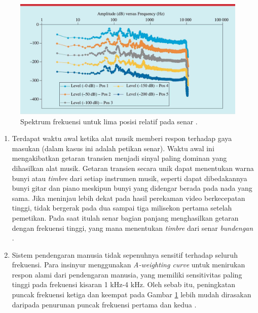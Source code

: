 \begin{figure}[t!]
    \centering
    \includegraphics[width=14 cm]{Gambar/spektrumFrekPaperParikesit.jpg}
    \caption{Spektrum frekuensi untuk lima posisi relatif \bandulan pada senar \cite{illusiveSound}.}
    \label{fig:spektrumFrekPaperParikesit}
\end{figure}
\begin{enumerate}
    \item Terdapat waktu awal ketika alat musik memberi respon terhadap gaya masukan (dalam kasus ini adalah petikan senar). Waktu awal ini mengakibatkan getaran transien menjadi sinyal paling dominan yang dihasilkan alat musik. Getaran transien secara unik dapat menentukan warna bunyi atau \textit{timbre} dari setiap instrumen musik, seperti dapat dibedakannya bunyi gitar dan piano meskipun bunyi yang didengar berada pada nada yang sama. Jika meninjau lebih dekat pada hasil perekaman video berkecepatan tinggi, \bandulan tidak bergerak pada dua sampai tiga milisekon pertama setelah pemetikan. Pada saat itulah senar bagian panjang menghasilkan getaran dengan frekuensi tinggi, yang mana menentukan \textit{timbre} dari senar \textit{bundengan} \cite{illusiveSound}.
    \item Sistem pendengaran manusia tidak sepenuhnya sensitif terhadap seluruh frekuensi. Para insinyur menggunakan \textit{A-weighting curve} untuk menirukan respon alami dari pendengaran manusia, yang memiliki sensitivitas paling tinggi pada frekuensi kisaran 1 kHz-4 kHz. Oleh sebab itu, peningkatan puncak frekuensi ketiga dan keempat pada Gambar \ref{fig:spektrumFrekPaperParikesit} lebih mudah dirasakan daripada penurunan puncak frekuensi pertama dan kedua \cite{illusiveSound}.
\end{enumerate}

